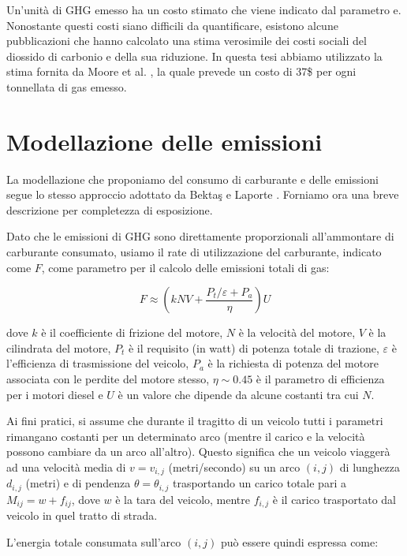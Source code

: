 	Un’unità di GHG emesso ha un costo stimato che viene indicato dal parametro e. Nonostante questi costi siano difficili da quantificare, esistono alcune pubblicazioni che hanno calcolato una stima verosimile dei costi sociali del diossido di carbonio e della sua riduzione. In questa tesi abbiamo utilizzato la stima fornita da Moore et al. \cite{moore2015temperature}, la quale prevede un costo di 37\$ per ogni tonnellata di gas emesso.

\section{Modellazione delle emissioni}
\label{sec:modellazione_emissioni}
	La modellazione che proponiamo del consumo di carburante e delle emissioni segue lo stesso approccio adottato da Bektaş e Laporte \cite{Laporte11}. Forniamo ora una breve descrizione per completezza di esposizione.

	Dato che le emissioni di GHG sono direttamente proporzionali all’ammontare di carburante consumato, usiamo il rate di utilizzazione del carburante, indicato come $F$, come parametro per il calcolo delle emissioni totali di gas:

	\begin{equation}
		\label{eq:fuel_consumption}
		F \approx \left( kNV + \frac{P_t \slash \varepsilon + P_a}{\eta} \right) U
	\end{equation}

	dove $k$ è il coefficiente di frizione del motore, $N$ è la velocità del motore, $V$ è la cilindrata del motore, $P_{t}$ è il requisito (in watt) di potenza totale di trazione, $\varepsilon$ è l'efficienza di trasmissione del veicolo, $P_{a}$ è la richiesta di potenza del motore associata con le perdite del motore stesso, $\eta \sim 0.45$ è il parametro di efficienza per i motori diesel e $U$ è un valore che dipende da alcune costanti tra cui $N$.

	Ai fini pratici, si assume che durante il tragitto di un veicolo tutti i parametri rimangano costanti per un determinato arco (mentre il carico e la velocità possono cambiare da un arco all’altro). Questo significa che un veicolo viaggerà ad una velocità media di $v=v_{i,j}$ (metri/secondo) su un arco $(i,j)$ di lunghezza $d_{i,j}$ (metri) e di pendenza $\theta = \theta_{i,j}$ trasportando un carico totale pari a $M_{ij} = w + f_{ij}$, dove $w$ è la tara del veicolo, mentre $f_{i,j}$ è il carico trasportato dal veicolo in quel tratto di strada.

	L’energia totale consumata sull’arco $(i,j)$ può essere quindi espressa come:

